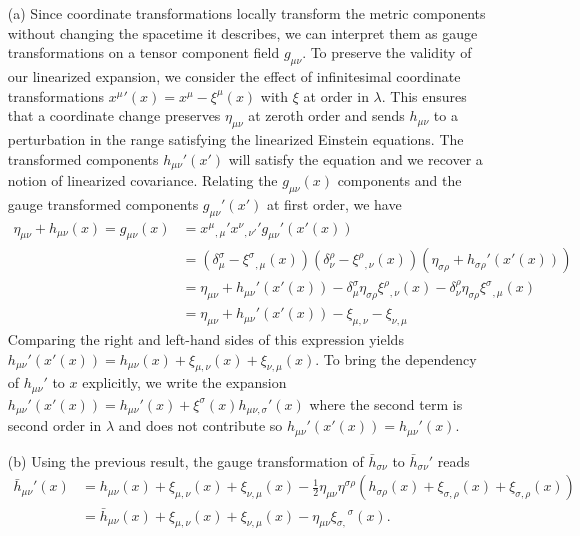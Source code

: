 \documentclass[10pt, a4paper]{article}
\begin{document}
\begin{enumerate}
  \item[(a)] Since coordinate transformations locally transform the metric components without changing the spacetime it describes, we can interpret them as gauge transformations on a tensor component field $g_{\mu\nu}$. To preserve the validity of our linearized expansion, we consider the effect of infinitesimal coordinate transformations $x^{\mu}{}'(x) = x^{\mu} - \xi^{\mu}(x)$ with $\xi$ at order in $\lambda$. This ensures that a coordinate change preserves $\eta_{\mu\nu}$ at zeroth order and sends $h_{\mu\nu}$ to a perturbation in the range satisfying the linearized Einstein equations.  The transformed components $h_{\mu\nu}'(x')$ will satisfy the equation and we recover a notion of linearized covariance. Relating the $g_{\mu\nu}(x)$ components and the gauge transformed components $g_{\mu\nu}'(x')$ at first order, we have 
  \begin{align*}
    \eta_{\mu\nu} + h_{\mu\nu}(x) = g_{\mu\nu}(x) &= x^{\mu}{}_{,\mu}' x^{\nu}{}_{,\nu'}' g_{\mu\nu}'(x'(x))\\
    &= (\delta^{\sigma}_\mu - \xi^{\sigma}{}_{,\mu}(x))(\delta^{\rho}_\nu- \xi^{\rho}{}_{,\nu}(x))(\eta_{\sigma\rho} + h_{\sigma\rho}'(x'(x)))\\
    &= \eta_{\mu\nu} + h_{\mu\nu}'(x'(x)) - \delta^{\sigma}_\mu \eta_{\sigma \rho} \xi^{\rho}{}_{,\nu}(x) - \delta^{\rho}_\nu \eta_{\sigma \rho} \xi^{\sigma}{}_{,\mu}(x)\\
    &= \eta_{\mu\nu} + h_{\mu\nu}'(x'(x)) - \xi_{\mu,\nu} - \xi_{\nu,\mu}
  \end{align*}
  Comparing the right and left-hand sides of this expression yields $h_{\mu\nu}'(x'(x)) = h_{\mu\nu}(x) + \xi_{\mu,\nu}(x) + \xi_{\nu,\mu}(x)$. To bring the dependency of $h_{\mu\nu}'$ to $x$ explicitly, we write the expansion $h_{\mu\nu}'(x'(x)) = h_{\mu\nu}'(x) + \xi^{\sigma}(x) h_{\mu\nu, \sigma}'(x)$ where the second term is second order in $\lambda$ and does not contribute so $h_{\mu\nu}'(x'(x)) = h_{\mu\nu}'(x)$.
  \item[(b)] Using the previous result, the gauge transformation of $\bar{h}_{\sigma \nu}$ to $\bar{h}_{\sigma \nu}'$ reads
  \begin{align*}
    \bar{h}_{\mu \nu}'(x) &= h_{\mu\nu}(x) + \xi_{\mu,\nu}(x) + \xi_{\nu,\mu}(x) - \frac{1}{2}\eta_{\mu \nu} \eta^{\sigma \rho} (h_{\sigma\rho}(x) + \xi_{\sigma,\rho}(x) + \xi_{\sigma,\rho}(x))\\
    &= \bar{h}_{\mu\nu}(x) + \xi_{\mu,\nu}(x) + \xi_{\nu,\mu}(x) - \eta_{\mu \nu} \xi_{\sigma,}{}^{\sigma}(x).

\end{align*}
\end{enumerate}
\end{document}
